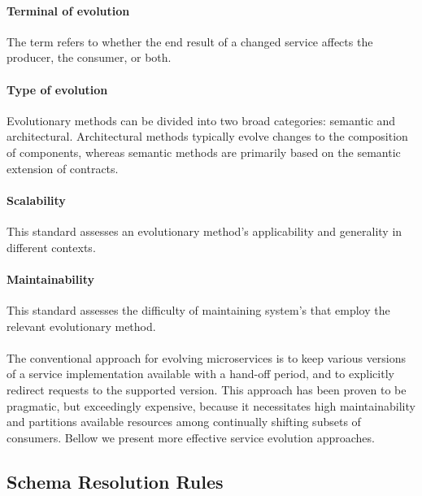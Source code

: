 \paragraph{Terminal of evolution}
The term refers to whether the end result of a changed service affects the producer, the consumer, or both.

\paragraph{Type of evolution}
Evolutionary methods can be divided into two broad categories: semantic and architectural.
Architectural methods typically evolve changes to the composition of components, whereas semantic methods are primarily based on the semantic extension of contracts.

\paragraph{Scalability}
This standard assesses an evolutionary method's applicability and generality in different contexts.

\paragraph{Maintainability}
This standard assesses the difficulty of maintaining system's that employ the relevant evolutionary method.

\paragraph{}

The conventional approach for evolving microservices is to keep various versions of a service implementation available with a hand-off period,
and to explicitly redirect requests to the supported version.
This approach has been proven to be pragmatic, but exceedingly expensive,
because it necessitates high maintainability and partitions available resources among continually shifting subsets of consumers.
Bellow we present more effective service evolution approaches.

\subsection{Schema Resolution Rules} %
\label{sec:schema_resolution_rules}

